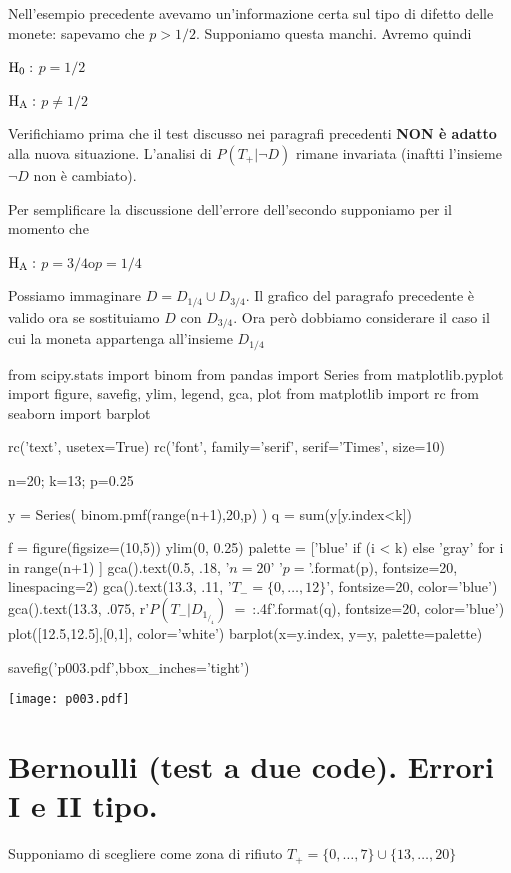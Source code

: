\documentclass[10pt,openany]{book}
\def\H0{{\rm H_0}}
\def\HA{{\rm H_A}}
\theoremstyle{mio}
\theoremstyle{liscio}
\begin{document}
Nell'esempio precedente avevamo un'informazione certa sul tipo di difetto delle monete: sapevamo che $p>1/2$. Supponiamo questa manchi. Avremo quindi

$\H0:$ $p=1/2$

$\HA:$ $p\neq1/2$

Verifichiamo prima che il test discusso nei paragrafi precedenti \textbf{NON è adatto\/} alla nuova situazione. L'analisi di $P(T_+|\neg D)$ rimane invariata (inaftti l'insieme $\neg D$ non è cambiato).

Per semplificare la discussione dell'errore dell'secondo supponiamo per il momento che 

$\HA:$ $p=3/4$\quad o\quad $p=1/4$ 

Possiamo immaginare $D=D_{1/4}\cup D_{3/4}$. Il grafico del paragrafo precedente è valido ora se sostituiamo $D$ con $D_{3/4}$. Ora però dobbiamo considerare il caso il cui la moneta appartenga all'insieme $D_{1/4}$

\begin{pycode}
from scipy.stats import binom
from pandas import Series
from matplotlib.pyplot import figure, savefig, ylim, legend, gca, plot
from matplotlib import rc
from seaborn import barplot

rc('text', usetex=True)
rc('font', family='serif', serif='Times', size=10)


n=20; k=13; p=0.25

y = Series( binom.pmf(range(n+1),20,p) )
q = sum(y[y.index<k])

f = figure(figsize=(10,5))
ylim(0, 0.25)
palette = ['blue' if (i < k) else 'gray' for i in range(n+1) ]
gca().text(0.5, .18, '$n=20$\n' '$p={}$'.format(p), fontsize=20, linespacing=2)
gca().text(13.3, .11, '$T_-=\{0,\dots,12\}$', fontsize=20, color='blue')
gca().text(13.3, .075, r'$P(T_-|D_1 _/ _4)$\ =\ {:.4f}'.format(q), fontsize=20, color='blue')
plot([12.5,12.5],[0,1], color='white')
barplot(x=y.index, y=y, palette=palette)

savefig('p003.pdf',bbox_inches='tight')
\end{pycode}
\hfil\texttt{[image: p003.pdf]}


\clearpage\section{Bernoulli (test a due code). Errori I e II tipo.}

Supponiamo di scegliere come zona di rifiuto $T_+=\{0,\dots,7\}\cup \{13,\dots,20\}$
\end{document}
